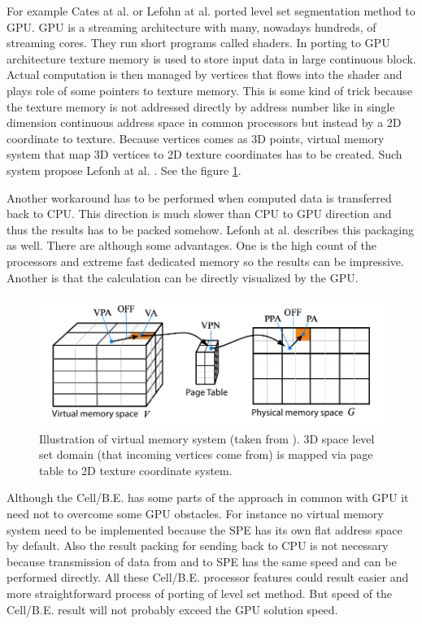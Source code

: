 \par
For example Cates at al. \cite{GIST} or Lefohn at al. \cite{lefonhGPUSolver} ported level set segmentation method to GPU.
GPU is a streaming architecture with many, nowadays hundreds, of streaming cores.
They run short programs called shaders.
In porting to GPU architecture texture memory is used to store input data in large continuous block.
Actual computation is then managed by vertices that flows into the shader and plays role of some pointers to texture memory.
This is some kind of trick because the texture memory is not addressed directly by address number like in single dimension continuous address space in common processors but instead by a 2D coordinate to texture.
Because vertices comes as 3D points, virtual memory system that map 3D vertices to 2D texture coordinates has to be created.
Such system propose Lefonh at al. \cite{lefonhGPUSolver}. See the figure \ref{fg:virtual memory on GPU}.

\par
Another workaround has to be performed when computed data is transferred back to CPU.
This direction is much slower than CPU to GPU direction and thus the results has to be packed somehow.
Lefonh at al. \cite{lefonhGPUSolver} describes this packaging as well.
There are although some advantages.
One is the high count of the processors and extreme fast dedicated memory so the results can be impressive.
Another is that the calculation can be directly visualized by the GPU.

\begin{figure}
    \centering
    \includegraphics[width=\textwidth]{data/png/gpuVirtMemory}
    \caption[GPU virtual memory]{Illustration of virtual memory system (taken from \cite{lefonhGPUSolver}). 3D space level set domain (that incoming vertices come from) is mapped via page table to 2D texture coordinate system.}
    \label{fg:virtual memory on GPU}
\end{figure}

\par
Although the \mbox{Cell/B.E.} has some parts of the approach in common with GPU it need not to overcome some GPU obstacles.
For instance no virtual memory system need to be implemented because the SPE has its own flat address space by default.
Also the result packing for sending back to CPU is not necessary because transmission of data from and to SPE has the same speed and can be performed directly.
All these \mbox{Cell/B.E.} processor features could result easier and more straightforward process of porting of level set method.
But speed of the \mbox{Cell/B.E.} result will not probably exceed the GPU solution speed.
